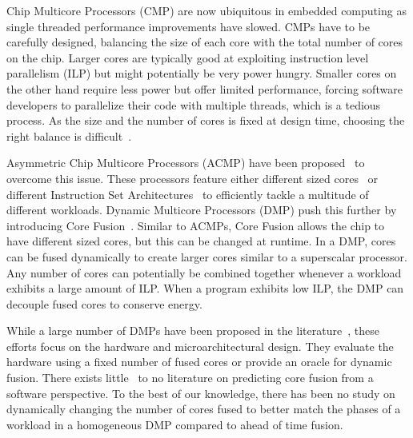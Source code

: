 Chip Multicore Processors (CMP) are now ubiquitous in embedded computing as single threaded performance improvements have slowed.
CMPs have to be carefully designed, balancing the size of each core with the total number of cores on the chip.
Larger cores are typically good at exploiting instruction level parallelism (ILP) but might potentially be very power hungry.
Smaller cores on the other hand require less power but offer limited performance, forcing software developers to parallelize their code with multiple threads, which is a tedious process.
As the size and the number of cores is fixed at design time, choosing the right balance is difficult~\cite{DubachExpl2012, TomuskHet2015}.

Asymmetric Chip Multicore Processors (ACMP) have been proposed~\cite{MittalSurv2016} to overcome this issue.
These processors feature either different sized cores~\cite{JibajaPPerf2016} or different Instruction Set Architectures~\cite{VenkatISADiv2014} to efficiently tackle a multitude of different workloads.
Dynamic Multicore Processors (DMP) push this further by introducing Core Fusion~\cite{ipek2007CoreFusion}.
Similar to ACMPs, Core Fusion allows the chip to have different sized cores, but this can be changed at runtime.
In a DMP, cores can be fused dynamically to create larger cores similar to a superscalar processor.
Any number of cores can potentially be combined together whenever a workload exhibits a large amount of ILP.
When a program exhibits low ILP, the DMP can decouple fused cores to conserve energy.

While a large number of DMPs have been proposed in the literature~\cite{ipek2007CoreFusion,pricopi2012bahurupi,kim2007tflex,Watanabe2010Widget}, these efforts focus on the hardware and microarchitectural design.
They evaluate the hardware using a fixed number of fused cores or provide an oracle for dynamic fusion.
There exists little~\cite{micolet2016dmpstream} to no literature on predicting core fusion from a software perspective.
To the best of our knowledge, there has been no study on dynamically changing the number of cores fused to better match the phases of a workload in a homogeneous DMP compared to ahead of time fusion.

